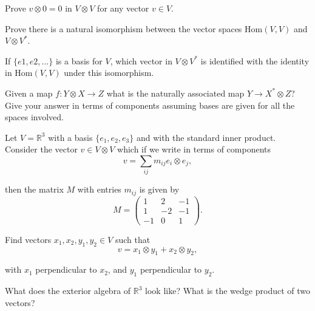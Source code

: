   \begin{exercise} 
    Prove $v \otimes 0 = 0$ in $V \otimes V$ for any vector $v \in V$.
  \end{exercise}

  \begin{exercise} 
    Prove there is a natural isomorphism between the vector spaces $\text{Hom}(V,V)$ and $V \otimes V^*$.
  \end{exercise}

  \begin{exercise} 
    If $\{e1,e2,...\}$ is a basis for $V$, which vector in $V \otimes V^*$ is identified with the identity in $\text{Hom}(V,V)$ under this isomorphism.
  \end{exercise}

  \begin{exercise} 
    Given a map $f : Y \otimes X \to Z$ what is the naturally associated map $Y \to X^* \otimes Z$? Give your answer in terms of components assuming bases are given for all the spaces involved.
  \end{exercise}

  \begin{exercise} 
    Let $V = \mathbb{R}^3$ with a basis $\{e_1, e_2, e_3\}$ and with the standard inner product. Consider the vector $v \in V \otimes V$ which if we write in terms of components
    \[v = \sum_{ij} m_{ij}e_i \otimes e_j,\]
    
    then the matrix $M$ with entries $m_{ij}$ is given by
    \[M = \begin{pmatrix} 1 & 2 & -1 \\ 1 & -2 & -1 \\ -1 & 0 & 1 \end{pmatrix}.\]
    
    Find vectors $x_1, x_2, y_1, y_2 \in V$ such that
    \[v = x_1 \otimes y_1 + x_2 \otimes y_2,\]
    
    with $x_1$ perpendicular to $x_2$, and $y_1$ perpendicular to $y_2$.
  \end{exercise}

  \begin{exercise} 
    What does the exterior algebra of $\mathbb{R}^3$ look like? What is the wedge product of two vectors?
  \end{exercise}


